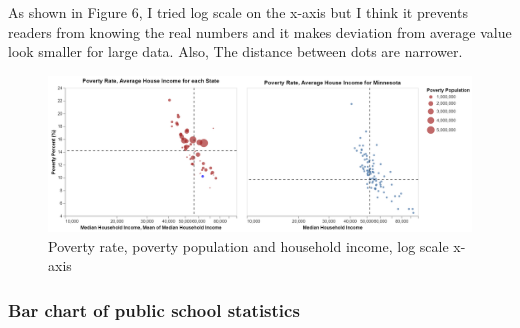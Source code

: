 \documentclass{article}
\begin{document}
\newpage
\noindent
As shown in Figure 6, I tried log scale on the x-axis but I think it prevents readers from knowing the real numbers and it makes deviation from average value look smaller for large data. Also, The distance between dots are narrower. \\
\begin{figure}[htbp]
    \centering
    \includegraphics[scale=0.3]{EM_att.png}
    \caption{Poverty rate, poverty population and household income, log scale x-axis}
\end{figure}

\subsubsection*{Bar chart of public school statistics}
\end{document}
